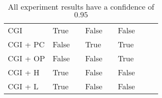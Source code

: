 \begin{table}
\begin{tabular}{l|l|l|l|l|l|l|l}
    CGI       & True &\relax[0.990, 1] & False & \relax[0, 0.01] & False & \relax[0, 0.01]                                                                                     & ~ \\
    CGI + PC  & False & \relax[0.723, 0.733] & True & \relax[0.227, 0.237] & True & \relax[0.031, 0.041]        & ~ \\
    CGI + OP  & False & \relax[0.990, 1] & False & \relax[0, 0.01] & True & \relax[0, 0.01]                                                                                     & ~ \\
    CGI + H   & True &\relax[0.990, 1] & False & \relax[0, 0.01] & False & \relax[0, 0.01]                                                                                    & ~ \\
    CGI + L   & True & \relax[0.990, 1] & False & \relax[0, 0.01] & False & \relax[0, 0.01]                                                                                    & ~ \\
    \end{tabular}
    \caption{All experiment results have a confidence of $0.95$}
\end{table}